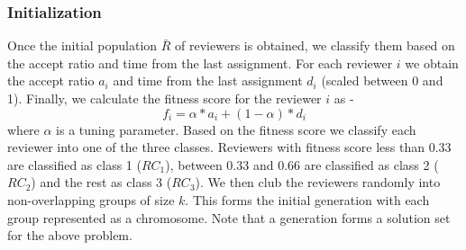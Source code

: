 

\subsubsection*{Initialization} Once the initial population $\bar R$ of reviewers is obtained, we classify them based on 
the accept ratio and time from the last assignment. For each reviewer $i$ we obtain the accept ratio $a_{i}$ and time from the last 
assignment $d_i$ (scaled between 0 and 1). Finally, we calculate the fitness score for the reviewer $i$ as -
\begin{equation}
 f_i = \alpha \ast a_i + (1-\alpha)\ast d_i
\end{equation}
where $\alpha$ is a tuning parameter. Based on the fitness score we classify each reviewer into one of the three classes. Reviewers with fitness score 
less than $0.33$ are classified as class 1 ($RC_1$), between $0.33$ and $0.66$ are classified as class 2 ($RC_2$) and the rest as class 3 ($RC_3$). 
We then club the reviewers randomly into non-overlapping groups of size $k$. This forms the initial generation with each group represented as 
a chromosome. Note that a generation forms a solution set for the above problem.

